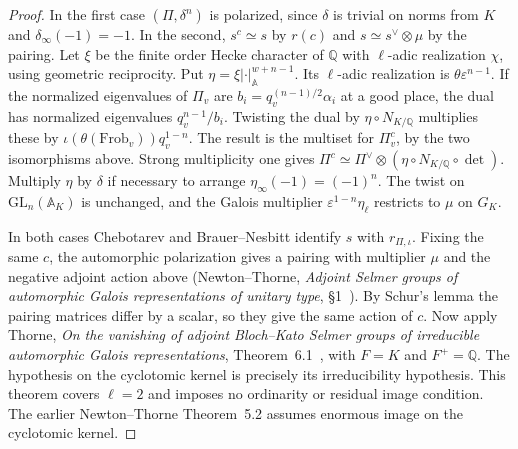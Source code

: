 \begin{proof}
In the first case $(\Pi,\delta^n)$ is polarized, since $\delta$ is
trivial on norms from $K$ and $\delta_\infty(-1)=-1$. In the second,
$s^c\simeq s$ by $r(c)$ and $s\simeq s^\vee\otimes\mu$ by the pairing.
Let $\xi$ be the finite order Hecke character of $\mathbb Q$ with
$\ell$-adic realization $\chi$, using geometric reciprocity. Put
$\eta=\xi|\cdot|_{\mathbb A}^{w+n-1}$. Its $\ell$-adic realization is
$\theta\varepsilon^{n-1}$. If the normalized eigenvalues of $\Pi_v$
are $b_i=q_v^{(n-1)/2}\alpha_i$ at a good place, the dual has normalized
eigenvalues $q_v^{n-1}/b_i$. Twisting the dual by $\eta\circ N_{K/\mathbb Q}$
multiplies these by $\iota(\theta(\mathrm{Frob}_v))q_v^{1-n}$.
The result is the multiset for $\Pi^c_v$, by the two isomorphisms above.
Strong multiplicity one gives
$\Pi^c\simeq\Pi^\vee\otimes(\eta\circ N_{K/\mathbb Q}\circ\det)$.
Multiply $\eta$ by $\delta$ if necessary to arrange
$\eta_\infty(-1)=(-1)^n$. The twist on $\mathrm{GL}_n(\mathbb A_K)$
is unchanged, and the Galois multiplier
$\varepsilon^{1-n}\eta_\ell$ restricts to $\mu$ on $G_K$.

In both cases Chebotarev and Brauer--Nesbitt identify $s$ with
$r_{\Pi,\iota}$. Fixing the same $c$, the automorphic polarization gives
a pairing with multiplier $\mu$ and the negative adjoint action above
(Newton--Thorne,
\emph{Adjoint Selmer groups of automorphic Galois representations of unitary
type}, \S1~\cite{newtonThorne}). By Schur's lemma the pairing matrices differ by a scalar,
so they give the same action of $c$. Now apply
Thorne, \emph{On the vanishing
of adjoint Bloch--Kato Selmer groups of irreducible automorphic Galois
representations}, Theorem~6.1~\cite{thorneAdjoint}, with $F=K$ and $F^+=\mathbb Q$.
The hypothesis on the cyclotomic kernel is precisely its irreducibility
hypothesis. This theorem covers $\ell=2$ and imposes no ordinarity or
residual image condition. The earlier Newton--Thorne Theorem~5.2
assumes enormous image on the cyclotomic kernel.


\end{proof}
